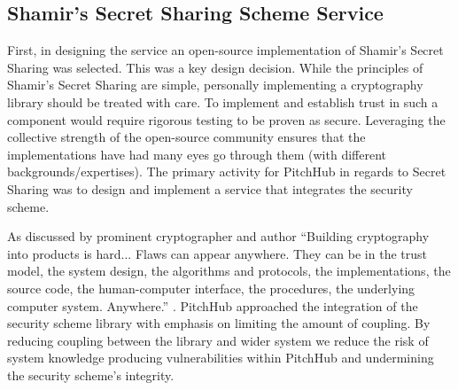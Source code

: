 \subsection{Shamir's Secret Sharing Scheme Service}\label{SS:design_shamir_secret_sharing_service}
First, in designing the service an open-source implementation of Shamir's Secret Sharing was selected. This was a key design decision. While the principles of Shamir's Secret Sharing are simple, personally implementing a cryptography library should be treated with care. To implement and establish trust in such a component would require rigorous testing to be proven as secure. Leveraging the collective strength of the open-source community ensures that the implementations have had many eyes go through them (with different backgrounds/expertises). The primary activity for PitchHub in regards to Secret Sharing was to design and implement a service that integrates the security scheme.
\par
As discussed by prominent cryptographer and author \citeauthor{schneier1999cryptography} ``Building cryptography into products is hard... Flaws can appear anywhere. They can be in the trust model, the system design, the algorithms and protocols, the implementations, the source code, the human-computer interface, the procedures, the underlying computer system. Anywhere.'' \cite{schneier1999cryptography}. PitchHub  approached the integration of the security scheme library with emphasis on limiting the amount of coupling. By reducing coupling between the library and wider system we reduce the risk of system knowledge producing vulnerabilities within PitchHub and undermining the security scheme's integrity.
\par
